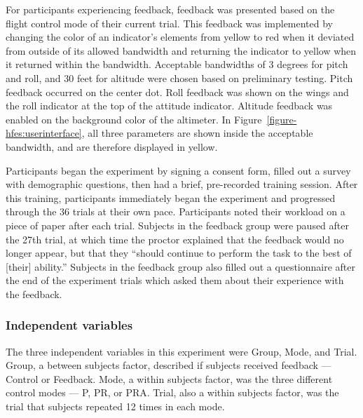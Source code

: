 For participants experiencing feedback, feedback was presented based on the flight control mode of their current trial.
This feedback was implemented by changing the color of an indicator's elements from yellow to red when it deviated from outside of its allowed bandwidth and returning the indicator to yellow when it returned within the bandwidth.
Acceptable bandwidths of 3 degrees for pitch and roll, and 30 feet for altitude were chosen based on preliminary testing.
Pitch feedback occurred on the center dot.
Roll feedback was shown on the wings and the roll indicator at the top of the attitude indicator.
Altitude feedback was enabled on the background color of the altimeter.
In Figure~\ref{figure-hfes:userinterface}, all three parameters are shown inside the acceptable bandwidth, and are therefore displayed in yellow.

Participants began the experiment by signing a consent form, filled out a survey with demographic questions, then had a brief, pre-recorded training session.
After this training, participants immediately began the experiment and progressed through the 36 trials at their own pace.
Participants noted their workload on a piece of paper after each trial.
Subjects in the feedback group were paused after the 27th trial, at which time the proctor explained that the feedback would no longer appear, but that they ``should continue to perform the task to the best of [their] ability.'' Subjects in the feedback group also filled out a questionnaire after the end of the experiment trials which asked them about their experience with the feedback.

\subsubsection{Independent variables}
The three independent variables in this experiment were Group, Mode, and Trial.
Group, a between subjects factor, described if subjects received feedback --- Control or Feedback.
Mode, a within subjects factor, was the three different control modes --- P, PR, or PRA.
Trial, also a within subjects factor, was the trial that subjects repeated 12 times in each mode.

